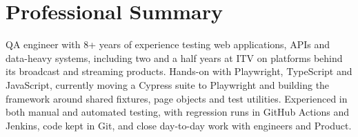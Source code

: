 \section{Professional Summary}
QA engineer with 8+ years of experience testing web applications, APIs and data-heavy systems, including two and a half years at ITV on platforms behind its broadcast and streaming products. Hands-on with Playwright, TypeScript and JavaScript, currently moving a Cypress suite to Playwright and building the framework around shared fixtures, page objects and test utilities. Experienced in both manual and automated testing, with regression runs in GitHub Actions and Jenkins, code kept in Git, and close day-to-day work with engineers and Product.







